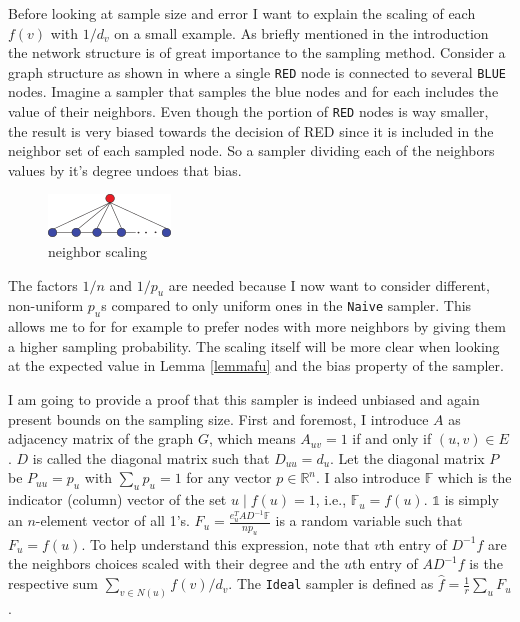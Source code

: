 Before looking at sample size and error I want to explain the scaling of each $f(v)$ with $1/d_v$ on a small example.
As briefly mentioned in the introduction the network structure is of great importance to the sampling method. Consider a graph structure as shown in  where a single \texttt{RED} node is connected to several \texttt{BLUE} nodes.
Imagine a sampler that samples the blue nodes and for each includes the value of their neighbors. Even though the portion of \texttt{RED} nodes is way smaller, the result is very biased towards the decision of {RED} since it is included in the neighbor set of each sampled node. So a sampler dividing each of the neighbors values by it's degree undoes that bias.
\begin{figure}[!ht]
  \begin{center}
    \includegraphics{fig1a}
    \caption{neighbor scaling}
  \end{center}
\end{figure}
The factors $1/n$ and $1/p_u$ are needed because I now want to consider different, non-uniform $p_u$s compared to only uniform ones in the \texttt{Naive} sampler. This allows me to for for example to prefer nodes with more neighbors by giving them a higher sampling probability. The scaling itself will be more clear when looking at the expected value in Lemma \ref{lemmafu} and the bias property of the sampler.

I am going to provide a proof that this sampler is indeed unbiased and again present bounds on the sampling size.
First and foremost, I introduce $A$ as adjacency matrix of the graph $G$, which means $A_{uv} = 1$ if and only if $(u,v) \in E$. $D$ is called the diagonal matrix such that $D_{uu} = d_u$.
Let the diagonal matrix $P$ be $P_{uu} = p_u$ with $\sum\nolimits_{u}p_u = 1$ for any vector $p \in \mathbb{R}^n$.
I also introduce $\mathds{F}$ which is the indicator (column) vector of the set ${u\;|\;f(u)=1}$, i.e., $\mathds{F}_u=f(u)$.
$\mathds{1}$ is simply an $n$-element vector of all 1's.
$F_u = \frac{e_u^TAD^{-1}\mathds{F}}{np_u}$ is a random variable such that $F_u = f(u)$.
To help understand this expression, note that $v$th entry of $D^{-1}f$ are the neighbors choices scaled with their degree and the $u$th entry of $AD^{-1}f$ is the respective sum $\sum_{v\in N(u)}f(v)/d_v$.
The \texttt{Ideal} sampler is defined as $\hat{f} = \frac{1}{r}\sum_{u}F_u$.

